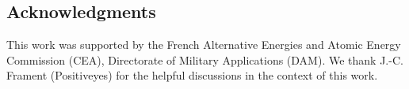 \documentclass[global,twocolumn,final,numbook]{svjour}
\begin{document}
\subsection*{Acknowledgments}
This work was supported by the French Alternative Energies and Atomic
Energy Commission (CEA), Directorate of Military Applications
(DAM). 
We thank J.-C. Frament (Positiveyes) for the helpful discussions in
the context of this work.


\end{document}
